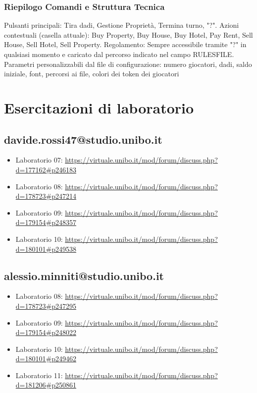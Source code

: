 \subsection{Riepilogo Comandi e Struttura Tecnica}
Pulsanti principali: Tira dadi, Gestione Proprietà, Termina turno, "?".
Azioni contestuali (casella attuale): Buy Property, Buy House, Buy Hotel, Pay Rent, Sell House, Sell Hotel, Sell Property.\newline 
Regolamento: Sempre accessibile tramite "?" in qualsiasi momento e caricato dal percorso indicato nel campo RULESFILE.\newline 
Parametri personalizzabili dal file di configurazione: numero giocatori, dadi, saldo iniziale, font, percorsi ai file, colori dei token dei giocatori
\chapter{Esercitazioni di laboratorio}
\section{davide.rossi47@studio.unibo.it}
\begin{itemize}
    \item Laboratorio 07: \url{https://virtuale.unibo.it/mod/forum/discuss.php?d=177162#p246183}
    \item Laboratorio 08: \url{https://virtuale.unibo.it/mod/forum/discuss.php?d=178723#p247214}
    \item Laboratorio 09: \url{https://virtuale.unibo.it/mod/forum/discuss.php?d=179154#p248357}
    \item Laboratorio 10: \url{https://virtuale.unibo.it/mod/forum/discuss.php?d=180101#p249538}
\end{itemize}
\section{alessio.minniti@studio.unibo.it}
\begin{itemize}
    \item Laboratorio 08: \url{https://virtuale.unibo.it/mod/forum/discuss.php?d=178723#p247295}
    \item Laboratorio 09: \url{https://virtuale.unibo.it/mod/forum/discuss.php?d=179154#p248022}
    \item Laboratorio 10: \url{https://virtuale.unibo.it/mod/forum/discuss.php?d=180101#p249462}
    \item Laboratorio 11: \url{https://virtuale.unibo.it/mod/forum/discuss.php?d=181206#p250861}
\end{itemize}